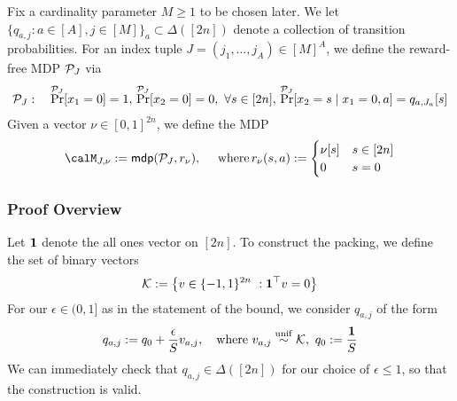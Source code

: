 

Fix a cardinality parameter $M \ge 1$ to be chosen later. We let $\{q_{a,j}: a \in [A], j \in [M]\}_{a } \subset \Delta([2n])$ denote a collection of transition probabilities. For an index tuple $J = (j_1,\dots,j_A) \in [M]^A$, we define the reward-free MDP $\mathcal{P}_J$ via
\begin{align*}
\mathcal{P}_J : \quad \Pr^{\mathcal{P}_J}[x_1 = 0] = 1,\,\Pr^{\mathcal{P}_J}[x_2 = 0] = 0,\,\, \forall s \in [2n],\, \Pr^{\mathcal{P}_J}[x_2 = s \mid x_1 = 0, a] = q_{a,J_a}[s]
\end{align*}
Given a vector $\nu \in [0,1]^{2n}$, we define the MDP 
\begin{align*}
\calM_{J,\nu} := \mdp(\calP_J, r_{\nu}),\quad \text{ where}\, r_{\nu}(s,a) := \begin{cases} \nu[s] & s \in [2n]\\
0 & s= 0\\
\end{cases}
\end{align*}


\subsubsection{Proof Overview}
Let $\mathbf{1}$ denote the all ones vector on $[2n]$. To construct the packing, we define the set of binary vectors
\begin{align*}
\mathcal{K} := \left\{v \in \{-1,1\}^{2n}~: \mathbf{1}^\top v = 0\right\}
\end{align*}
For our $\epsilon \in (0,1]$ as in the statement of the bound, we consider $q_{a,j}$ of the form
\begin{align*}
q_{a,j} := q_0 + \frac{\epsilon}{S}v_{a,j}, \quad \text{where } v_{a,j} \overset{\mathrm{unif}}{\sim} \mathcal{K},\,\, q_0 := \frac{\mathbf{1}}{S}
\end{align*}
We can immediately check that $q_{a,j} \in \Delta([2n])$ for our choice of $\epsilon \le 1$, so that the construction is valid. 


